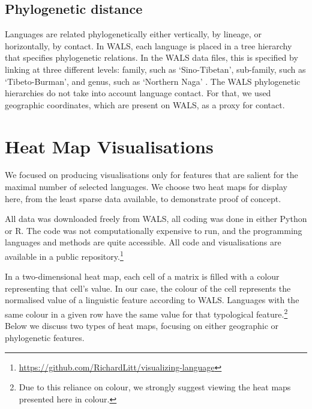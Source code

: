 \documentclass[11pt]{article}
\begin{document}
\subsection{Phylogenetic distance}

Languages are related phylogenetically either vertically, by lineage, or horizontally, by contact. In WALS, each language is placed in a tree hierarchy that specifies phylogenetic relations. In the WALS data files, this is specified by linking at three different levels: family, such as `Sino-Tibetan', sub-family, such as `Tibeto-Burman', and genus, such as `Northern Naga' . The WALS phylogenetic hierarchies do not take into account language contact. For that, we used geographic coordinates, which are present on WALS, as a proxy for contact. 


\section{Heat Map Visualisations}

We focused on producing visualisations only for features that are salient for the maximal number of selected languages. We choose two heat maps for display here, from the least sparse data available, to demonstrate proof of concept. 


All data was downloaded freely from WALS, all coding was done in either Python or R. The code was not computationally expensive to run, and the programming languages and methods are quite accessible. All code and visualisations are available in a public repository.\footnote{\url{https://github.com/RichardLitt/visualizing-language}}

In a two-dimensional heat map, each cell of a matrix is filled with a colour representing that cell's value. In our case, the colour of the cell represents the normalised value of a linguistic feature according to WALS. Languages with the same colour in a given row have the same value for that typological feature.\footnote{Due to this reliance on colour, we strongly suggest viewing the heat maps presented here in colour.} Below we discuss two types of heat maps, focusing on either geographic or phylogenetic features.
\end{document}
